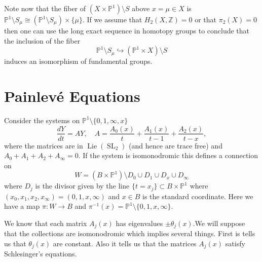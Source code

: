 \documentclass[12pt]{book}
\numberwithin{equation}{section}
\theoremstyle{definition}
\theoremstyle{remark}
\newcommand{\ZZ}{\mathbb{Z}}
\newcommand{\PP}{\mathbb{P}}
\newcommand{\SL}{\operatorname{SL}}
\newcommand{\Lie}{\operatorname{Lie}}
\begin{document}
Note now that the fiber of $(X\times \PP^1)\setminus S$ above $x=\mu\in X$ is $\PP^1\setminus S_{\mu} \cong (\PP^1\setminus S_{\mu}) \times \lbrace \mu \rbrace$.
If we assume that $H_2(X,\ZZ)=0$ or that $\pi_2(X)=0$ then one can use the long exact sequence in homotopy groups to conclude that the inclusion of the fiber 
 $$ \PP^1\setminus S_{\mu} \hookrightarrow (\PP^1\times X)\setminus S $$
induces an isomorphism of fundamental groups.

\fi

\section{Painlev\'e Equations}

Consider the systems on $\PP^1\setminus \lbrace 0,1,\infty,x\rbrace$ 
$$ \dfrac{dY}{dt} = AY, \quad A = \frac{A_0(x)}{t}+\frac{A_1(x)}{t-1}+ \frac{A_2(x)}{t-x},$$
where the matrices are in $\Lie(\SL_2)$ (and hence are trace free) and  $A_0+A_1+A_2+A_{\infty}=0$.
If the system is isomonodromic this defines a connection on 
$$W=(B\times \PP^1)\setminus D_0\cup D_1 \cup D_x \cup D_{\infty}$$ 
where $D_j$ is the divisor given by the line $\lbrace t = x_j \rbrace \subset B\times \PP^1$ where $(x_0,x_1,x_2,x_{\infty}) = (0,1,x,\infty)$ and $x\in B$ is the standard coordinate.
Here we have a map $\pi\colon W\to B$ and $\pi^{-1}(x) = \PP^1\setminus \lbrace 0,1,x,\infty\rbrace$.

We know that each matrix $A_j(x)$ has eigenvalues $\pm \theta_j(x)$.We will suppose that the collections are isomonodromic which implies several things.
First is tells us that $\theta_j(x)$ are constant. 
Also it tells us that the matrices $A_j(x)$ satisfy Schlesinger's equations. 
\end{document}
